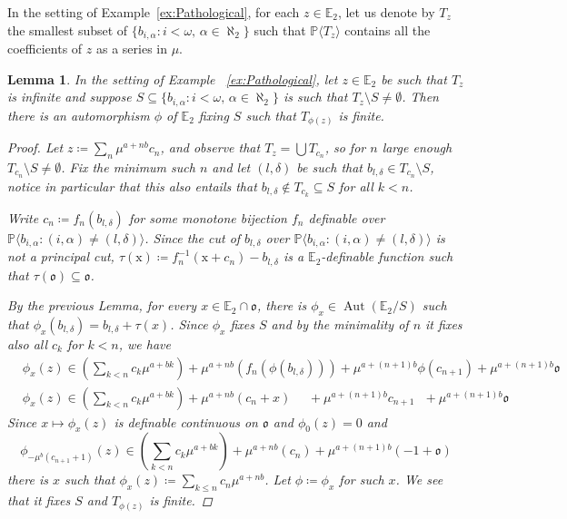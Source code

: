 \documentclass{amsart}
\newtheorem{lemma}[theorem]{Lemma}
\theoremstyle{remark}
\theoremstyle{definition}
\theoremstyle{plain}
\newcommand{\bE}{\mathbb E}
\newcommand{\bP}{\mathbb P}
\newcommand{\co}{\mathfrak o}
\DeclareMathOperator{\Aut}{\mathrm{Aut}}
\newcommand{\var}[1]{\mathrm{#1}}
\theoremstyle{plain}
\begin{document}
In the setting of Example~\ref{ex:Pathological}, for each $z\in \bE_2$, let us denote by $T_z$ the smallest subset of $\{b_{i,\alpha}: i<\omega, \, \alpha \in \aleph_2\}$ such that $\bP\langle T_z \rangle$ contains all the coefficients of $z$ as a series in $\mu$.
 
\begin{lemma}\label{lem:Example_simplifying_auto}
    In the setting of Example ~\ref{ex:Pathological}, let $z \in \bE_2$ be such that $T_z$ is infinite and suppose $S\subseteq \{b_{i,\alpha}: i<\omega, \, \alpha \in \aleph_2\}$ is such that $T_z \setminus S \neq \emptyset$. Then there is an automorphism $\phi$ of $\bE_2$ fixing $S$ such that $T_{\phi(z)}$ is finite.
    \begin{proof}
        Let $z\coloneqq  \sum_{n}\mu^{a+nb}c_n$, and observe that $T_z=\bigcup T_{c_n}$, so for $n$ large enough $T_{c_n}\setminus S\neq \emptyset$. Fix the minimum such $n$ and let $(l, \delta)$ be such that $b_{l,\delta} \in T_{c_n}\setminus S$, notice in particular that this also entails that $b_{l, \delta} \notin T_{c_k}\subseteq S$ for all $k<n$.
        
        Write $c_{n}\coloneqq f_n(b_{l, \delta})$ for some monotone bijection $f_n$ definable over $\bP\langle b_{i, \alpha}: (i, \alpha) \neq (l, \delta)\rangle$. Since the cut of $b_{l, \delta}$ over $\bP\langle b_{i, \alpha}: (i, \alpha) \neq (l, \delta)\rangle$ is not a principal cut, $\tau(\var{x})\coloneqq  f_n^{-1}(\var{x}+c_n)-b_{l, \delta}$ is a $\bE_2$-definable function such that $\tau(\co)\subseteq \co$.
        
        By the previous Lemma, for every $x\in \bE_2 \cap \co$, there is $\phi_x \in \Aut(\bE_2/S)$ such that $\phi_x(b_{l, \delta})=b_{l, \delta}+\tau(x)$. Since $\phi_x$ fixes $S$ and by the minimality of $n$ it fixes also all $c_k$ for $k<n$, we have
        \begin{align*}
            &\phi_x(z) \in \left(\sum_{k<n}c_k\mu^{a+bk}\right) + \mu^{a+nb}(f_n(\phi(b_{l,\delta}))) +\mu^{a+(n+1)b}\phi(c_{n+1}) + \mu^{a+(n+1)b} \co\\
            &\phi_x(z) \in \left(\sum_{k<n}c_k\mu^{a+bk}\right) + \mu^{a+nb}(c_n+x) \ \ \ \ \ \ +\mu^{a+(n+1)b}c_{n+1} \ \ \ +\mu^{a+(n+1)b} \co
        \end{align*}
        Since $x\mapsto \phi_x(z)$ is definable continuous on $\co$ and $\phi_0(z)=0$ and 
        \[\phi_{-\mu^b(c_{n+1}+1)}(z)\in \left(\sum_{k<n}c_k\mu^{a+bk}\right) +\mu^{a+nb}(c_n) + \mu^{a+(n+1)b} (-1+\co)\]
        there is $x$ such that $\phi_x(z)\coloneqq \sum_{k\le n} c_n \mu^{a+nb}$. Let $\phi\coloneqq \phi_x$ for such $x$.
        We see that it fixes $S$ and $T_{\phi(z)}$ is finite.
    \end{proof}
\end{lemma}
\end{document}
